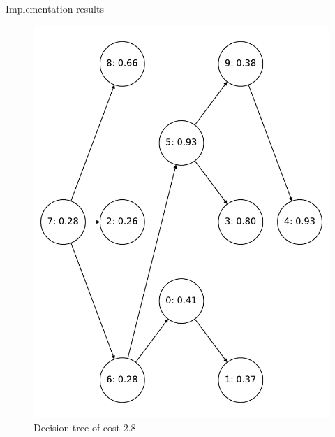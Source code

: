 \begin{frame}[allowframebreaks]{Implementation results}
\begin{figure}[htp]
{\begin{minipage}[t]{0.49\textwidth}
            \includegraphics[width=\textwidth]{figures/computed/dt_10.pdf}
            \caption{Decision tree of cost 2.8.}
        \end{minipage}
        }
    \end{figure}


\end{frame}
